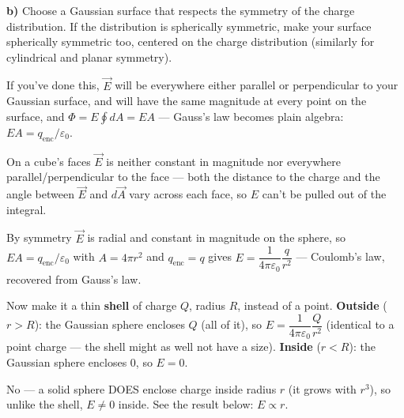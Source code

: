 \documentclass[11pt]{article}
\newcommand{\ANS}[1]{\textcolor{accent}{#1}}
\begin{document}
\textbf{b)} Choose a Gaussian surface that respects the \ANS{symmetry} of the charge
distribution. If the distribution is spherically symmetric, make your surface spherically
symmetric too, \ANS{centered on the charge distribution} (similarly for cylindrical and
planar symmetry).

If you've done this, $\vec E$ will be everywhere either \ANS{parallel} or
\ANS{perpendicular} to your Gaussian surface, and will have the same \ANS{magnitude}
at every point on the surface, and $\Phi=E\oint dA=EA$ --- Gauss's law
becomes plain algebra: $EA=q_{\text{enc}}/\varepsilon_0$.

{\small\color{accent} On a cube's faces $\vec E$ is neither constant in magnitude nor
everywhere parallel/perpendicular to the face --- both the distance to the charge and the
angle between $\vec E$ and $d\vec A$ vary across each face, so $E$ can't be pulled out of
the integral.}

\newpage

\begin{center}
\end{center}

By symmetry $\vec E$ is radial and constant in magnitude on the sphere, so
$EA=q_{\text{enc}}/\varepsilon_0$ with $A=4\pi r^2$ and $q_{\text{enc}}=q$ gives
$E={}$\ANS{$\dfrac{1}{4\pi\varepsilon_0}\dfrac{q}{r^2}$} --- Coulomb's law, recovered from
Gauss's law.

Now make it a thin \textbf{shell} of charge $Q$, radius $R$, instead of a point.
\textbf{Outside} ($r>R$): the Gaussian sphere encloses \ANS{$Q$ (all of it)}, so
$E={}$\ANS{$\dfrac{1}{4\pi\varepsilon_0}\dfrac{Q}{r^2}$} (identical to a point charge ---
the shell might as well not have a size). \textbf{Inside} ($r<R$): the Gaussian sphere
encloses \ANS{$0$}, so $E={}$\ANS{$0$}.

{\small\color{accent} No --- a solid sphere DOES enclose charge inside radius $r$ (it grows
with $r^3$), so unlike the shell, $E\neq0$ inside. See the result below: $E\propto r$.}
\end{document}
